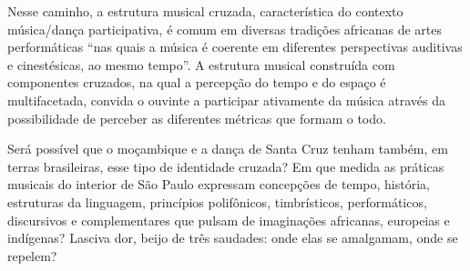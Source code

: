 Nesse caminho, a estrutura musical cruzada, característica do contexto
música/dança participativa, é comum em diversas tradições africanas de
artes performáticas ``nas quais a música é coerente em diferentes
perspectivas auditivas e cinestésicas, ao mesmo tempo''. A estrutura
musical construída com componentes cruzados, na qual a percepção do
tempo e do espaço é multifacetada, convida o ouvinte a participar
ativamente da música através da possibilidade de perceber as diferentes
métricas que formam o todo.

Será possível que o moçambique e a dança de Santa Cruz tenham também, em
terras brasileiras, esse tipo de identidade cruzada? Em que medida as
práticas musicais do interior de São Paulo expressam concepções de
tempo, história, estruturas da linguagem, princípios polifônicos,
timbrísticos, performáticos, discursivos e complementares que pulsam de
imaginações africanas, europeias e indígenas? Lasciva dor, beijo de três
saudades: onde elas se amalgamam, onde se repelem?

